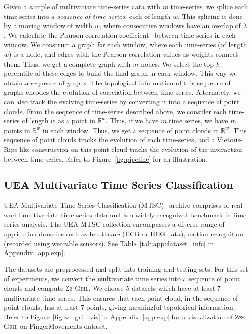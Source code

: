 \documentclass{article}
\newcommand{\zzgril}{\textsc{Zz-Gril}}
\newcommand{\RR}{\mathbb{R}}
\theoremstyle{plain}
\theoremstyle{definition}
\theoremstyle{remark}
\newcommand{\Shreyas}[1]		{{ \textcolor{orange} {S: #1}}}
\begin{document}
Given a sample of multivariate time-series data with $m$ time-series, we splice each time-series into a \emph{sequence of time-series}, each of length $w$. This splicing is done by a moving window of width $w$, where consecutive windows have an overlap of $\lambda$. We calculate the Pearson correlation coefficient~\cite{pcc} between time-series in each window. We construct a graph for each window, where each time-series (of length $w$) is a node, and edges with the Pearson correlation values as weights connect them. Thus, we get a complete graph with $m$ nodes. We select the top $k$ percentile of these edges to build the final graph in each window. This way we obtain a sequence of graphs. The topological information of this sequence of graphs encodes the evolution of correlation between time series. Alternately, we can also track the evolving time-series by converting it into a sequence of point clouds. From the sequence of time-series described above, we consider each time-series of length $w$ as a point in $\RR^w$. Thus, if we have $m$ time series, we have $m$ points in $\RR^w$ in each window. Thus, we get a sequence of point clouds in $\RR^w$. This sequence of point clouds tracks the evolution of each time-series, and a Vietoris-Rips like construction on this point cloud tracks the evolution of the interaction between time-series. Refer to Figure~\ref{fig:pipeline} for an illustration. 



\subsection{UEA Multivariate Time Series Classification}
UEA Multivariate Time Series Classification (MTSC)~\cite{ueamvts} archive comprises of real-world multivariate time series data and is a widely recognized benchmark in time series analysis. The UEA MTSC collection encompasses a diverse range of application domains such as healthcare (ECG or EEG data), motion recognition (recorded using wearable sensors). See Table~\ref{tab:app:dataset_info} in Appendix~\ref{app:exp}. 

The datasets are preprocessed and split into training and testing sets. 
For this set of experiments, we convert the multivariate time series into a sequence of point clouds and compute \zzgril{}. We choose 5 datasets which have at least 7 multivariate time series. This ensures that each point cloud, in the sequence of point clouds, has at least 7 points, giving meaningful topological information. Refer to Figure~\ref{fig:zz_gril_vis} in Appendix~\ref{app:exp} for a visualization of \zzgril{} on FingerMovements dataset.
\end{document}
